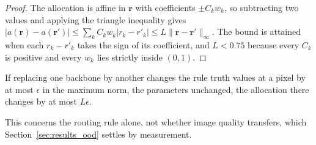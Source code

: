 \begin{proof}
The allocation is affine in $\mathbf{r}$ with coefficients $\pm C_k w_k$, so subtracting two values
and applying the triangle inequality gives
$|a(\mathbf{r}) - a(\mathbf{r}')| \le \sum_k C_k w_k |r_k - r'_k| \le L \lVert \mathbf{r} - \mathbf{r}' \rVert_\infty$.
The bound is attained when each $r_k - r'_k$ takes the sign of its coefficient, and $L < 0.75$
because every $C_k$ is positive and every $w_k$ lies strictly inside $(0,1)$.
\end{proof}

\begin{corollary}
\label{cor:transfer}
If replacing one backbone by another changes the rule truth values at a pixel by at most $\epsilon$
in the maximum norm, the parameters unchanged, the allocation there changes by at most $L\epsilon$.
\end{corollary}
\noindent This concerns the routing rule alone, not whether image quality transfers, which
Section~\ref{sec:results_ood} settles by measurement.
